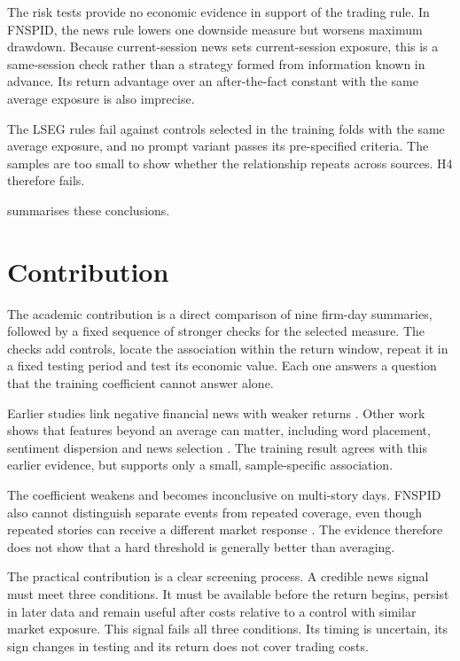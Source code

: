 The risk tests provide no economic evidence in support of the trading rule. In
FNSPID, the news rule lowers one downside measure but worsens maximum drawdown.
Because current-session news
sets current-session exposure, this is a same-session check rather than a
strategy formed from information known in advance. Its return advantage over an
after-the-fact constant with the same average exposure is also imprecise.

The LSEG rules fail against controls selected in the training folds with the
same average exposure, and no prompt variant passes its pre-specified criteria. The
samples are too small to show whether the relationship repeats across sources.
H4 therefore fails.

 summarises these conclusions.

\FloatBarrier

\section{Contribution}

The academic contribution is a direct comparison of nine firm-day summaries,
followed by a fixed sequence of stronger checks for the selected measure. The
checks add controls, locate the association within the return window, repeat it
in a fixed testing period and test its economic value. Each one answers a
question that the training coefficient cannot answer alone.

Earlier studies link negative financial news with weaker returns
\citep{tetlock2008words,uhl2014,heston2017}. Other work shows that features
beyond an average can matter, including word placement, sentiment dispersion
and news selection \citep{allee2015,isakin2023,uhl2021}. The training result
agrees with this earlier evidence, but supports only a small, sample-specific
association.

The coefficient weakens and becomes inconclusive on multi-story days. FNSPID
also cannot distinguish separate events from repeated coverage, even though
repeated stories can receive a different market response
\citep{tetlock2011stale}. The evidence therefore does not show that a hard
threshold is generally better than averaging.

The practical contribution is a clear screening process. A credible news signal
must meet three conditions. It must be available before the return begins,
persist in later data and remain useful after costs relative to a control with
similar market exposure. This signal fails all three conditions. Its timing is
uncertain, its sign changes in testing and its return does not cover trading
costs.

